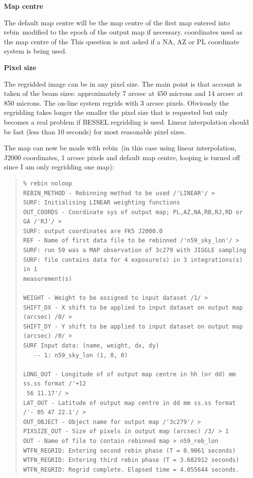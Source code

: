 \documentclass[twoside,11pt]{article}
\newcommand{\task}[1]{{\sf #1}}
\newcommand{\rebin}{\htmlref{\task{rebin}}{REBIN}}
\newenvironment{myquote}{\begin{quote}\begin{small}}{\end{small}\end{quote}}
\newcommand{\htmlref}[2]{#1}
\renewcommand{\_}{\texttt{\symbol{95}}}
\begin{document}
\begin{description}
\item {\bf Map centre}

The default map centre will be the map centre of the first map entered into
\rebin\ modified to the epoch of the output map if necessary.  coordinates
used as the map centre of the This question is not asked if a NA, AZ or PL
coordinate system is being used.

\item {\bf Pixel size}

The regridded image can be in any pixel size. The main point is that account
is taken of the beam sizes: approximately 7 arcsec at 450 microns and 14
arcsec at 850 microns.  The on-line system regrids with 3 arcsec
pixels. Obviously the regridding takes longer the smaller the pixel size that
is requested but only becomes a real problem if BESSEL regridding is
used. Linear interpolation should be fast (less than 10 seconds) for most
reasonable pixel sizes.

\end{description}

The map can now be made with \rebin\ (in this case using linear interpolation,
J2000 coordinates, 1 arcsec pixels and default map centre, looping is turned
off since I am only regridding one map):
\begin{myquote}
\begin{verbatim}
% rebin noloop
REBIN_METHOD - Rebinning method to be used /'LINEAR'/ > 
SURF: Initialising LINEAR weighting functions
OUT_COORDS - Coordinate sys of output map; PL,AZ,NA,RB,RJ,RD or GA /'RJ'/ > 
SURF: output coordinates are FK5 J2000.0
REF - Name of first data file to be rebinned /'n59_sky_lon'/ > 
SURF: run 59 was a MAP observation of 3c279 with JIGGLE sampling
SURF: file contains data for 4 exposure(s) in 3 integrations(s) in 1
measurement(s)
 
WEIGHT - Weight to be assigned to input dataset /1/ > 
SHIFT_DX - X shift to be applied to input dataset on output map (arcsec) /0/ > 
SHIFT_DY - Y shift to be applied to input dataset on output map (arcsec) /0/ > 
SURF Input data: (name, weight, dx, dy)
   -- 1: n59_sky_lon (1, 0, 0)
 
LONG_OUT - Longitude of of output map centre in hh (or dd) mm ss.ss format /'+12
 56 11.17'/ > 
LAT_OUT - Latitude of output map centre in dd mm ss.ss format /'- 05 47 22.1'/ > 
OUT_OBJECT - Object name for output map /'3c279'/ > 
PIXSIZE_OUT - Size of pixels in output map (arcsec) /3/ > 1
OUT - Name of file to contain rebinned map > n59_reb_lon
WTFN_REGRID: Entering second rebin phase (T = 0.9061 seconds)
WTFN_REGRID: Entering third rebin phase (T = 3.682912 seconds)
WTFN_REGRID: Regrid complete. Elapsed time = 4.055644 seconds.
\end{verbatim}
\end{myquote}
\end{document}
